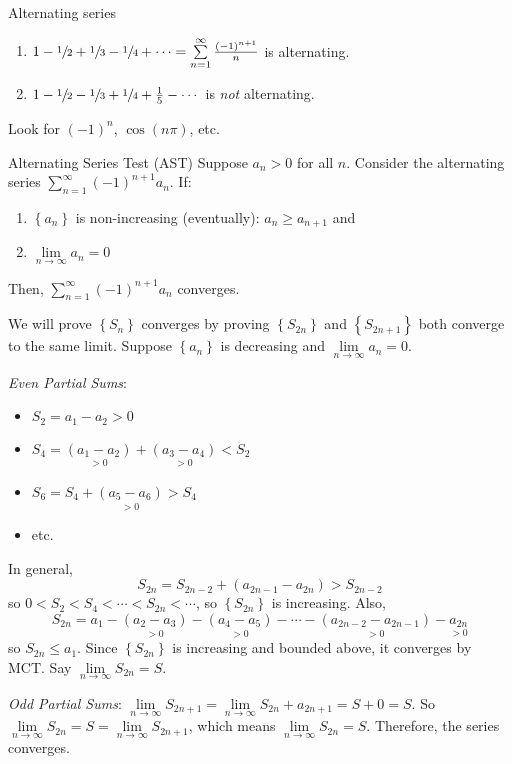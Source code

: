 \begin{Example}{Alternating series}{}
    \begin{enumerate}
        \item $ 1-\sfrac{1}{2}+\sfrac{1}{3} -\sfrac{1}{4} +\cdots=\sum\limits_{n=1}^{\infty}
                  \frac{(-1)^{n+1}}{n} $ is alternating.
        \item $ 1-\sfrac{1}{2} -\sfrac{1}{3} +\sfrac{1}{4} +\frac{1}{5} -\cdots $
              is \emph{not} alternating.
    \end{enumerate}
\end{Example}

\begin{Remark}{}{}
    Look for $ (-1)^n $, $ \cos(n\pi) $, etc.
\end{Remark}

\begin{Theorem}{Alternating Series Test (AST)}{}
    Suppose $ a_n>0 $ for all $ n $. Consider the alternating series
    $ \sum\limits_{n=1}^{\infty} (-1)^{n+1}a_n $. If:
    \begin{enumerate}
        \item $ \left\{ a_n\right\} $ is non-increasing (eventually): $ a_n\geqslant a_{n+1} $ and
        \item $ \lim\limits_{{n} \to {\infty}} a_n=0 $
    \end{enumerate}
    Then, $ \sum\limits_{n=1}^{\infty} (-1)^{n+1}a_n $ converges.
\end{Theorem}

\begin{Proof}{}{}
    We will prove $ \left\{ S_n\right\} $ converges by proving $ \left\{ S_{2n}\right\} $
    and $ \left\{ S_{2n+1}\right\} $ both converge to the same limit. Suppose
    $ \left\{ a_n\right\} $ is decreasing and $ \lim\limits_{{n} \to {\infty}} a_n=0 $.

    \emph{Even Partial Sums}:
    \begin{itemize}
        \item $ S_2=a_1-a_2>0 $
        \item $ S_4=\underset{>0}{(a_1-a_2)}+\underset{>0}{(a_3-a_4)}<S_2 $
        \item $ S_6=S_4+\underset{>0}{(a_5-a_6)}>S_4 $
        \item etc.
    \end{itemize}
    In general,
    \[ S_{2n}=S_{2n-2}+\left( a_{2n-1}-a_{2n} \right)>S_{2n-2} \]
    so $ 0<S_2<S_4<\cdots<S_{2n}<\cdots $, so $ \left\{ S_{2n}\right\} $ is increasing.
    Also,
    \[ S_{2n}=a_1-\underset{>0}{(a_2-a_3)}-\underset{>0}{(a_4-a_5)}-\cdots-
        \underset{>0}{(a_{2n-2}-a_{2n-1})}- \underset{>0}{a_{2n}} \]
    so $ S_{2n}\leqslant a_1 $. Since $ \left\{ S_{2n}\right\} $ is increasing and bounded above,
    it converges by MCT\@. Say $ \lim\limits_{{n} \to {\infty}} S_{2n}=S $.

    \emph{Odd Partial Sums}: $ \lim\limits_{{n} \to {\infty}} S_{2n+1}=
        \lim\limits_{{n} \to {\infty}} S_{2n}+a_{2n+1}=S+0=S $. So
    $ \lim\limits_{{n} \to {\infty}} S_{2n}=S=\lim\limits_{{n} \to {\infty}} S_{2n+1} $,
    which means $ \lim\limits_{{n} \to {\infty}} S_{2n}=S $. Therefore, the series converges.
\end{Proof}


